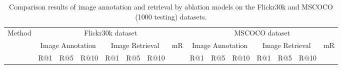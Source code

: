 \documentclass[10pt,twocolumn,letterpaper]{article}
\begin{document}
\begin{table*}[t] \small
\addtolength{\tabcolsep}{-1pt}
\centering
\caption{Comparison results of image annotation and retrieval by ablation models on the Flickr30k and MSCOCO (1000 testing) datasets. }
\begin{tabular}{l|ccc|ccc|c|ccc|ccc|c}
\hline
\hline
\multirow{3}{0.7cm}{Method}  &  \multicolumn{7}{c|}{Flickr30k dataset} &  \multicolumn{7}{c}{MSCOCO dataset}\\
\cline{2-15}
        &  \multicolumn{3}{c|}{Image Annotation}  &  \multicolumn{3}{c|}{Image Retrieval} & \multirow{2}{0.5cm}{{mR}}
&  \multicolumn{3}{c|}{Image Annotation}  &  \multicolumn{3}{c|}{Image Retrieval} & \multirow{2}{0.5cm}{{mR}}  \\
\cline{2-7}
\cline{9-14}
     & R$@$1 & R$@$5  & R$@$10   & R$@$1 & R$@$5  & R$@$10  &
&R$@$1 & R$@$5  & R$@$10   & R$@$1 & R$@$5  & R$@$10  &    \\
\hline


\end{tabular}
\end{table*}
\end{document}
